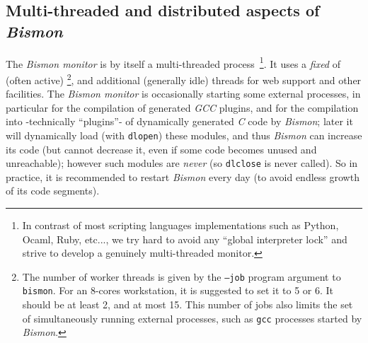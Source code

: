 \subsection{Multi-threaded and distributed aspects of \textit{Bismon}}
\label{subsec:multithreadist}

The \textit{Bismon monitor} is by itself a multi-threaded
process~\footnote{In contrast of most scripting languages
  implementations such as Python, Ocaml, Ruby, etc..., we try hard to
  avoid any ``global interpreter lock'' and strive to develop a
  genuinely multi-threaded monitor.}.
It uses a \emph{fixed} {} of
{} (often active)
\footnote{The number of worker threads is given by the \texttt{--job}
  program argument to \texttt{bismon}. For an 8-cores workstation, it
  is suggested to set it to 5 or 6. It should be at least 2, and at
  most 15. This number of jobs also limits the set of simultaneously
  running external processes, such as \texttt{gcc} processes started
  by \emph{Bismon}.}, and additional (generally idle) threads for web
support and other facilities. The \textit{Bismon monitor} is
occasionally starting some external processes, in particular for the
compilation of generated \emph{GCC} plugins, and for the compilation
into  -technically ``plugins''- of
dynamically generated \emph{C} code by \textit{Bismon}; later it will
dynamically load (with \texttt{dlopen}) these modules, and thus
\textit{Bismon} can increase its code (but cannot decrease it, even if
some code becomes unused and unreachable); however such modules are
\emph{never}  (so
\texttt{dlclose} is never called). So in practice, it is recommended
to restart \emph{Bismon} every day (to avoid endless growth of its
code segments).


